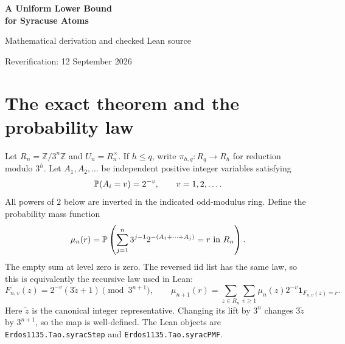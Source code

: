\documentclass[11pt,a4paper]{article}
\theoremstyle{definition}\newtheorem{definition}[theorem]{Definition}
\theoremstyle{remark}\newtheorem{remark}[theorem]{Remark}
\newcommand{\Z}{\mathbb Z}\newcommand{\N}{\mathbb N}\newcommand{\R}{\mathbb R}
\newcommand{\proj}[2]{\pi_{#1,#2}}
\newcommand{\code}[1]{{\small\nolinkurl{#1}}}
\begin{document}
\begin{center}
{\LARGE\bfseries\color{ink}A Uniform Lower Bound\\[4pt]for Syracuse Atoms}\par
\vspace{7pt}
{\large Mathematical derivation and checked Lean source}\par
\vspace{6pt}
{\sffamily Reverification: 12 September 2026}
\end{center}
\begin{abstract}
We derive a constant $c>0$, independent of the depth $n$ and the unit residue
$r\pmod{3^n}$, such that the actual Syracuse probability satisfies
$\mu_n(r)\ge c3^{-n}$. The connection is a positive-part comparison of
filtered backward marks with the full law, followed by a fixed-cylinder
argument and a bounded inverse step. We give the complete derivation of this
connection, state precisely the imported analytic inputs, explain their
summability mechanism, and append the consolidated Lean proof that was
compiled for this document. The argument uses substantial prior work by
Terence Tao and Lech Mazur. It does not prove the Collatz conjecture or
establish historical priority.
\end{abstract}
\tableofcontents
\newpage

\section{The exact theorem and the probability law}
Let $R_n=\Z/3^n\Z$ and $U_n=R_n^\times$. If $h\le q$, write
$\proj hq:R_q\to R_h$ for reduction modulo $3^h$.
Let $A_1,A_2,\ldots$ be independent positive integer variables satisfying
\begin{equation}\label{geom}
 \mathbb P(A_i=v)=2^{-v},\qquad v=1,2,\ldots.
\end{equation}
All powers of $2$ below are inverted in the indicated odd-modulus ring.
Define the probability mass function
\begin{equation}\label{law}
 \mu_n(r)=\mathbb P\left(\sum_{j=1}^{n}3^{j-1}2^{-(A_1+\cdots+A_j)}=r\text{ in }R_n\right).
\end{equation}
The empty sum at level zero is zero. The reversed iid list has the same
law, so this is equivalently the recursive law used in Lean:
\begin{equation}\label{step}
 F_{n,v}(z)=2^{-v}(3\widetilde z+1)\pmod{3^{n+1}},\qquad
 \mu_{n+1}(r)=\sum_{z\in R_n}\sum_{v\ge1}
 \mu_n(z)2^{-v}\mathbf1_{F_{n,v}(z)=r}.
\end{equation}
Here $\widetilde z$ is the canonical integer representative. Changing its
lift by $3^n$ changes $3\widetilde z$ by $3^{n+1}$, so the map is well-defined.
The Lean objects are \code{Erdos1135.Tao.syracStep} and
\code{Erdos1135.Tao.syracPMF}.
\end{document}

